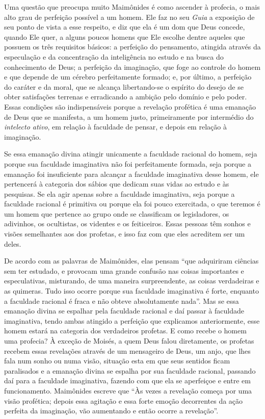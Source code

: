 Uma questão que preocupa muito Maimônides é como ascender à profecia, o
mais alto grau de perfeição possível a um homem. Ele faz no seu
\emph{Guia} a exposição de seu ponto de vista a esse respeito, e diz que
ela é um dom que Deus concede, quando Ele quer, a alguns poucos homens
que Ele escolhe dentre aqueles que possuem os três requisitos básicos: a
perfeição do pensamento, atingida através da especulação e da
concentração da inteligência no estudo e na busca do conhecimento de
Deus; a perfeição da imaginação, que foge ao controle do homem e que
depende de um cérebro perfeitamente formado; e, por último, a perfeição
do caráter e da moral, que se alcança libertando-se o espírito do desejo
de se obter satisfações terrenas e erradicando a ambição pelo domínio e
pelo poder. Essas condições são indispensáveis porque a revelação
profética é uma emanação de Deus que se manifesta, a um homem justo,
primeiramente por intermédio do \emph{intelecto ativo}, em relação à
faculdade de pensar, e depois em relação à imaginação.

Se essa emanação divina atingir unicamente a faculdade racional do
homem, seja porque sua faculdade imaginativa não foi perfeitamente
formada, seja porque a emanação foi insuficiente para alcançar a
faculdade imaginativa desse homem, ele pertencerá à categoria dos sábios
que dedicam suas vidas ao estudo e às pesquisas. Se ela agir apenas
sobre a faculdade imaginativa, seja porque a faculdade racional é
primitiva ou porque ela foi pouco exercitada, o que teremos é um homem
que pertence ao grupo onde se classificam os legisladores, os
adivinhos, os ocultistas, os videntes e os feiticeiros. Essas pessoas
têm sonhos e visões semelhantes aos dos profetas, e isso faz com que
eles acreditem ser um deles. 

De acordo com as palavras de Maimônides,
elas pensam ``que adquiriram ciências sem ter estudado, e provocam uma
grande confusão nas coisas importantes e especulativas, misturando, de
uma maneira surpreendente, as coisas verdadeiras e as quimeras. Tudo
isso ocorre porque sua faculdade imaginativa é forte, enquanto a
faculdade racional é fraca e não obteve absolutamente nada''. Mas se
essa emanação divina se espalhar pela faculdade racional e daí passar à
faculdade imaginativa, tendo ambas atingido a perfeição que explicamos
anteriormente, esse homem estará na categoria dos verdadeiros
profetas. E como recebe o homem uma profecia? À exceção de Moisés, a
quem Deus falou diretamente, os profetas recebem essas revelações através de
um mensageiro de Deus, um anjo, que lhes fala num sonho ou numa visão,
situação esta em que seus sentidos ficam paralisados e a emanação
divina se espalha por sua faculdade racional, passando daí para a
faculdade imaginativa, fazendo com que ela se aperfeiçoe e entre em
funcionamento. Maimônides escreve que ``Às vezes a revelação começa por
uma visão profética; depois essa agitação e essa forte emoção
decorrentes da ação perfeita da imaginação, vão aumentando e então
ocorre a revelação''.

